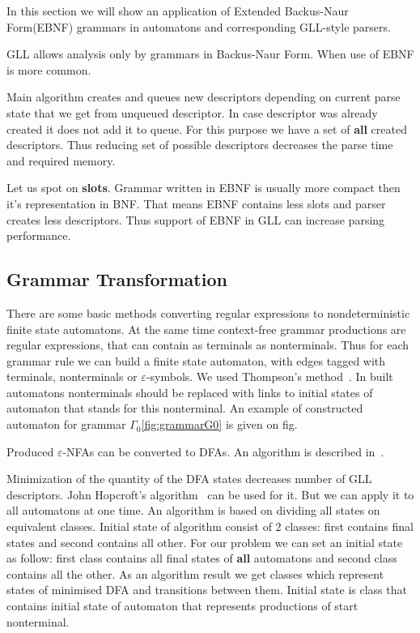 \documentclass[runningheads,a4paper]{llncs}
\begin{document}
In this section we will show an application of Extended Backus-Naur Form(EBNF) grammars in automatons and corresponding GLL-style parsers.

GLL allows analysis only by grammars in Backus-Naur Form. When use of EBNF is more common.

Main algorithm creates and queues new descriptors depending on current parse state that we get from unqueued descriptor. 
In case descriptor was already created it does not add it to queue. For this purpose we have a set of
\textbf{all} created descriptors. Thus reducing set of possible descriptors decreases the parse time
and required memory.

Let us spot on \textbf{slots}. Grammar written in EBNF is usually more compact then it's representation in BNF. That means EBNF contains 
less slots and parser creates less descriptors. Thus support of EBNF in GLL can increase parsing performance. 

\subsection{Grammar Transformation}%

There are some basic methods converting regular expressions to nondeterministic finite state automatons. 
At the same time context-free grammar productions are regular expressions, that can contain as terminals 
as nonterminals. Thus for each grammar rule we can build a finite state automaton, with edges tagged with 
terminals, nonterminals or $\varepsilon$-symbols. We used Thompson's method~\cite{Thompson:1968:PTR:363347.363387}. 
In built automatons nonterminals should be replaced with links to initial states of automaton that stands 
for this nonterminal. An example of constructed automaton for grammar $\Gamma_{0}$\ref{fig:grammarG0} is given on fig.

Produced $\varepsilon$-NFAs can be converted to DFAs. An algorithm is described in~\cite{aho1974design}.

Minimization of the quantity of the DFA states decreases number of GLL descriptors. John Hopcroft's 
algorithm~\cite{hopcroft1971n} can be used for it. But we can apply it to all automatons at one time. 
An algorithm is based on dividing all states on equivalent classes. Initial state of algorithm consist 
of 2 classes: first contains final states and second contains all other. For our problem we can set an 
initial state as follow: first class contains all final states of \textbf{all} automatons and second class 
contains all the other. As an algorithm result we get classes which represent states of minimised DFA and 
transitions between them.
Initial state is class that contains initial state of automaton that represents productions of start nonterminal.
\end{document}
